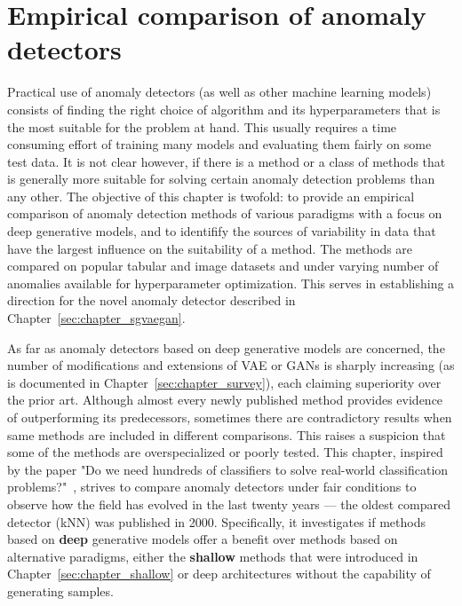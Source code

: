 \chapter{Empirical comparison of anomaly detectors} \label{sec:chapter_comparison}

Practical use of anomaly detectors (as well as other machine learning models) consists of finding the right choice of algorithm and its hyperparameters that is the most suitable for the problem at hand. This usually requires a time consuming effort of training many models and evaluating them fairly on some test data. It is not clear however, if there is a method or a class of methods that is generally more suitable for solving certain anomaly detection problems than any other. The objective of this chapter is twofold: to provide an empirical comparison of anomaly detection methods of various paradigms with a focus on deep generative models, and to identifify the sources of variability in data that have the largest influence on the suitability of a method. The methods are compared on popular tabular and image datasets and under varying number of anomalies available for hyperparameter optimization. This serves in establishing a direction for the novel anomaly detector described in Chapter~\ref{sec:chapter_sgvaegan}.

As far as anomaly detectors based on deep generative models are concerned, the number of modifications and extensions of VAE or GANs is sharply increasing (as is documented in Chapter~\ref{sec:chapter_survey}), each claiming superiority over the prior art. Although almost every newly published method provides evidence of outperforming its predecessors, sometimes there are contradictory results when same methods are included in different comparisons. This raises a suspicion that some of the methods are overspecialized or poorly tested. This chapter, inspired by the paper "Do we need hundreds of classifiers to solve real-world classification problems?"~\cite{fernandez2014we}, strives to compare anomaly detectors under fair conditions to observe how the field has evolved in the last twenty years --- the oldest compared detector (kNN) was published in 2000. Specifically, it investigates if methods based on \textbf{deep} generative models offer a benefit over methods based on alternative paradigms, either the \textbf{shallow} methods that were introduced in Chapter~\ref{sec:chapter_shallow} or deep architectures without the capability of generating samples.

